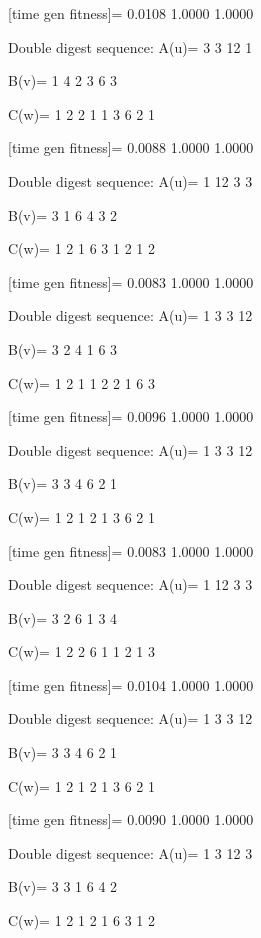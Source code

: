 [time gen fitness]=
    0.0108    1.0000    1.0000

Double digest sequence:
A(u)=
     3     3    12     1

B(v)=
     1     4     2     3     6     3

C(w)=
     1     2     2     1     1     3     6     2     1

[time gen fitness]=
    0.0088    1.0000    1.0000

Double digest sequence:
A(u)=
     1    12     3     3

B(v)=
     3     1     6     4     3     2

C(w)=
     1     2     1     6     3     1     2     1     2

[time gen fitness]=
    0.0083    1.0000    1.0000

Double digest sequence:
A(u)=
     1     3     3    12

B(v)=
     3     2     4     1     6     3

C(w)=
     1     2     1     1     2     2     1     6     3

[time gen fitness]=
    0.0096    1.0000    1.0000

Double digest sequence:
A(u)=
     1     3     3    12

B(v)=
     3     3     4     6     2     1

C(w)=
     1     2     1     2     1     3     6     2     1

[time gen fitness]=
    0.0083    1.0000    1.0000

Double digest sequence:
A(u)=
     1    12     3     3

B(v)=
     3     2     6     1     3     4

C(w)=
     1     2     2     6     1     1     2     1     3

[time gen fitness]=
    0.0104    1.0000    1.0000

Double digest sequence:
A(u)=
     1     3     3    12

B(v)=
     3     3     4     6     2     1

C(w)=
     1     2     1     2     1     3     6     2     1

[time gen fitness]=
    0.0090    1.0000    1.0000

Double digest sequence:
A(u)=
     1     3    12     3

B(v)=
     3     3     1     6     4     2

C(w)=
     1     2     1     2     1     6     3     1     2

